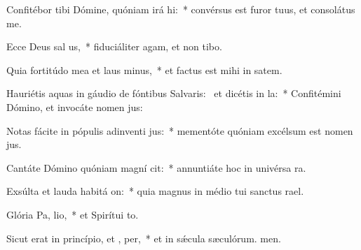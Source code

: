 \item Confitébor tibi Dómine, quóniam irá  hi:~* convérsus est furor tuus, et consolátus  me.
\item Ecce Deus sal us,~* fiduciáliter agam, et non tibo.
\item Quia fortitúdo mea et laus  minus,~* et factus est mihi in satem.
\item Hauriétis aquas in gáudio de fóntibus Salvaris:~\pscross{} et dicétis in  la:~* Confitémini Dómino, et invocáte nomen jus:
\item Notas fácite in pópulis adinventi jus:~* mementóte quóniam excélsum est nomen jus.
\item Cantáte Dómino quóniam magní cit:~* annuntiáte hoc in univérsa ra.
\item Exsúlta et lauda habitá on:~* quia magnus in médio tui sanctus rael.
\item Glória Pa,  lio,~* et Spirítui to.
\item Sicut erat in princípio, et ,  per,~* et in sǽcula sæculórum. men.
